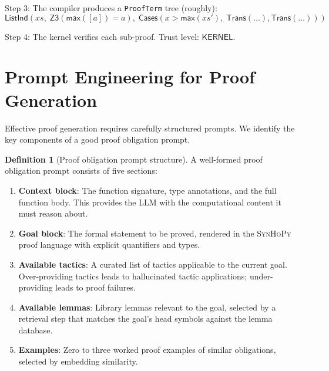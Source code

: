 \documentclass[11pt,a4paper]{report}
\theoremstyle{definition}
\newtheorem{definition}{Definition}[chapter]
\theoremstyle{plain}
\newcommand{\Trans}{\mathsf{Trans}}
\newcommand{\synhopy}{\textsc{SynHoPy}}
\begin{document}
Step 3: The compiler produces a \texttt{ProofTerm} tree (roughly):
\[
  \mathsf{ListInd}\!\left(xs,\;
    \mathsf{Z3}(\mathsf{max}([a]) = a),\;
    \mathsf{Cases}\!\left(x > \mathsf{max}(xs'),\;
      \Trans(\ldots), \Trans(\ldots)\right)\right)
\]

Step 4: The kernel verifies each sub-proof.  Trust level: $\mathsf{KERNEL}$.


\section{Prompt Engineering for Proof Generation}

Effective proof generation requires carefully structured prompts.  We identify
the key components of a good proof obligation prompt.

\begin{definition}[Proof obligation prompt structure]
\label{def:prompt-structure}
A well-formed proof obligation prompt consists of five sections:
\begin{enumerate}
  \item \textbf{Context block}: The function signature, type annotations, and
    the full function body.  This provides the LLM with the computational
    content it must reason about.
  \item \textbf{Goal block}: The formal statement to be proved, rendered in
    the \synhopy{} proof language with explicit quantifiers and types.
  \item \textbf{Available tactics}: A curated list of tactics applicable to the
    current goal.  Over-providing tactics leads to hallucinated tactic
    applications; under-providing leads to proof failures.
  \item \textbf{Available lemmas}: Library lemmas relevant to the goal, selected
    by a retrieval step that matches the goal's head symbols against the lemma
    database.
  \item \textbf{Examples}: Zero to three worked proof examples of similar
    obligations, selected by embedding similarity.
\end{enumerate}
\end{definition}
\end{document}
